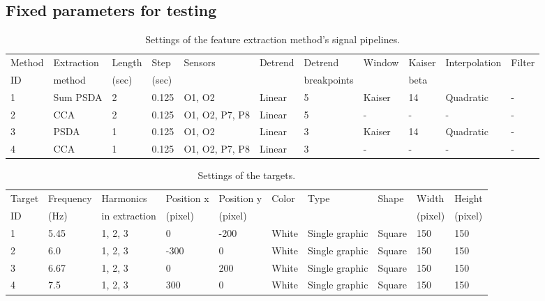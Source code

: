 \begin{appendices}
\begin{landscape}
\section{Fixed parameters for testing}
\label{sec:parameters}
	\begin{table}[h]
		\centering
		\begin{tabular}{|l|l|l|l|l|l|l|l|l|l|l|}\hline
Method& Extraction& Length& Step	& Sensors		& Detrend	& Detrend	 & Window& Kaiser& Interpolation& Filter\\
ID	& method	& (sec)	& (sec)	& 				& 			& breakpoints& 		 & beta	 & 				&  \\\hline
1	& Sum PSDA	& 2		& 0.125	& O1, O2		& Linear	& 5			 & Kaiser& 14	 & Quadratic	&- \\\hline
2	& CCA		& 2		& 0.125	& O1, O2, P7, P8& Linear	& 5			 & -	 & -	 & -			&- \\\hline
3	& PSDA		& 1		& 0.125	& O1, O2		& Linear	& 3			 & Kaiser& 14	 & Quadratic	&- \\\hline
4	& CCA		& 1		& 0.125	& O1, O2, P7, P8& Linear	& 3			 & -	 & -	 & -			&- \\\hline
		\end{tabular}
		\caption{Settings of the feature extraction method's signal pipelines.}
		\label{tab:pipelines}
	\end{table}
	\begin{table}[h]
		\centering
		\begin{tabular}{|l|l|l|l|l|l|l|l|l|l|}\hline
Target	& Frequency & Harmonics		& Position x& Position y& Color	& Type			& Shape	 & Width 	& Height\\
ID		& (Hz)		& in extraction	& (pixel)	& (pixel)	& 		& 		 		& 		 & (pixel)	&(pixel)\\\hline
1		& 5.45		& 1, 2, 3		& 0		 	& -200		& White	& Single graphic& Square & 150	 	& 150\\\hline
2		& 6.0		& 1, 2, 3		& -300	 	& 0			& White	& Single graphic& Square & 150	 	& 150\\\hline
3		& 6.67		& 1, 2, 3		& 0		 	& 200		& White	& Single graphic& Square & 150	 	& 150\\\hline
4		& 7.5		& 1, 2, 3		& 300	 	& 0			& White	& Single graphic& Square & 150	 	& 150\\\hline
		\end{tabular}
		\caption{Settings of the targets.}
		\label{tab:targets}
	\end{table}
\end{landscape}

\end{appendices}
